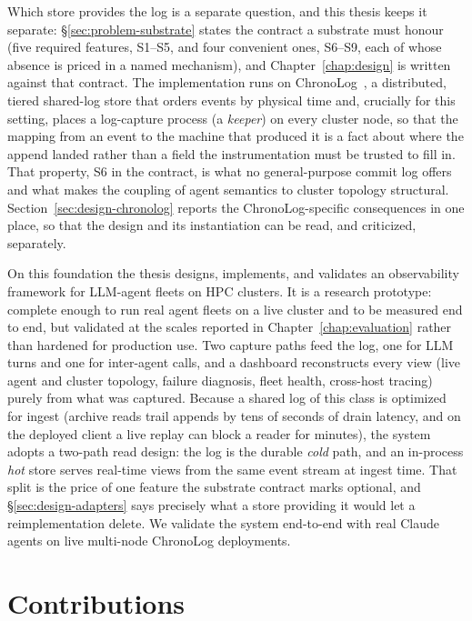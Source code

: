 Which store provides the log is a separate question, and this thesis keeps
it separate: \S\ref{sec:problem-substrate}
states the contract a substrate must honour (five required features,
S1--S5, and four convenient ones, S6--S9, each of whose absence is priced
in a named mechanism), and Chapter~\ref{chap:design} is written against
that contract. The implementation runs on
ChronoLog~\cite{kougkas2020chronolog}, a distributed, tiered shared-log
store that orders events by physical time and, crucially for this setting,
places a log-capture process (a \emph{keeper}) on every cluster node, so
that the mapping from an event to the machine that produced it is a fact
about where the append landed rather than a field the instrumentation must
be trusted to fill in. That property, S6 in the contract, is what no
general-purpose commit log offers and what makes the coupling of agent
semantics to cluster topology structural. Section~\ref{sec:design-chronolog}
reports the ChronoLog-specific consequences in one place, so that the design
and its instantiation can be read, and criticized, separately.

On this foundation the thesis designs, implements, and validates an
observability framework for LLM-agent fleets on HPC clusters. It
is a research prototype: complete enough to run real agent fleets on a
live cluster and to be measured end to end, but validated at the scales
reported in Chapter~\ref{chap:evaluation} rather than hardened for
production use.
Two capture paths feed the log,
one for LLM turns and one for inter-agent
calls, and a dashboard reconstructs every view (live agent and cluster
topology, failure diagnosis, fleet health, cross-host tracing) purely
from what was captured. Because a shared log of this class is
optimized for ingest (archive reads trail appends by tens of seconds of
drain latency, and on the deployed client a live replay can block a reader
for minutes), the
system adopts a two-path read design: the log is the
durable \emph{cold} path, and an in-process \emph{hot} store serves real-time
views from the same event stream at ingest time. That split is the price of
one feature the substrate contract marks optional, and
\S\ref{sec:design-adapters} says precisely what a store providing it would
let a reimplementation delete. We validate the system
end-to-end with real Claude agents on live multi-node ChronoLog deployments.

\section{Contributions}
\label{sec:intro-contributions}

